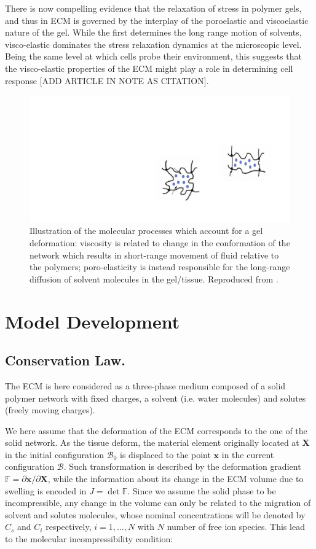 \documentclass[runningheads]{llncs}
\newcommand{\F}{\ensuremath{\mathbb{F}}}
\begin{document}
There is now compelling evidence that the relaxation of stress in polymer gels, and thus in ECM is governed by the interplay of the poroelastic and viscoelastic nature of the gel. While the first determines the long range motion of solvents, visco-elastic dominates the stress relaxation dynamics at the microscopic level. Being the same level at which cells probe their environment, this suggests that the visco-elastic properties of the ECM might play a role in determining cell response [ADD ARTICLE IN NOTE AS CITATION].

\begin{figure}
	\centering
	\includegraphics[scale=0.325]{latex/images/visco_poro}
	\caption{Illustration of the molecular processes which account for a gel deformation: viscosity is related to change in the conformation of the network which results in short-range movement of fluid relative to the polymers; poro-elasticity is instead responsible for the long-range diffusion of solvent molecules in the gel/tissue. Reproduced from \cite{viscoporo}.}
\end{figure}

\section{Model Development}
\subsection{Conservation Law.}

The ECM is here considered as a three-phase medium composed of a solid polymer network with fixed charges, a solvent (i.e. water molecules) and solutes (freely moving charges).

We here assume that the deformation of the ECM corresponds to the one of the solid network. As the tissue deform, the material element originally located at $\mathbf{X}$ in the initial configuration $\mathcal{B}_0$ is displaced to the point $\mathbf{x}$ in the current configuration $\mathcal{B}$. Such transformation is described by the deformation gradient $\F= \partial \mathbf{x}/\partial \mathbf{X}$, while the information about its change in the ECM volume due to swelling is encoded in $J= \det \F$. Since we assume the solid phase to be incompressible, any change in the volume can only be related to the migration of solvent and solutes molecules, whose nominal concentrations will be denoted by $C_s$ and $C_i$ respectively, $i=1,\ldots,N$ with $N$ number of free ion species. This lead to the molecular incompressibility condition:
\end{document}
